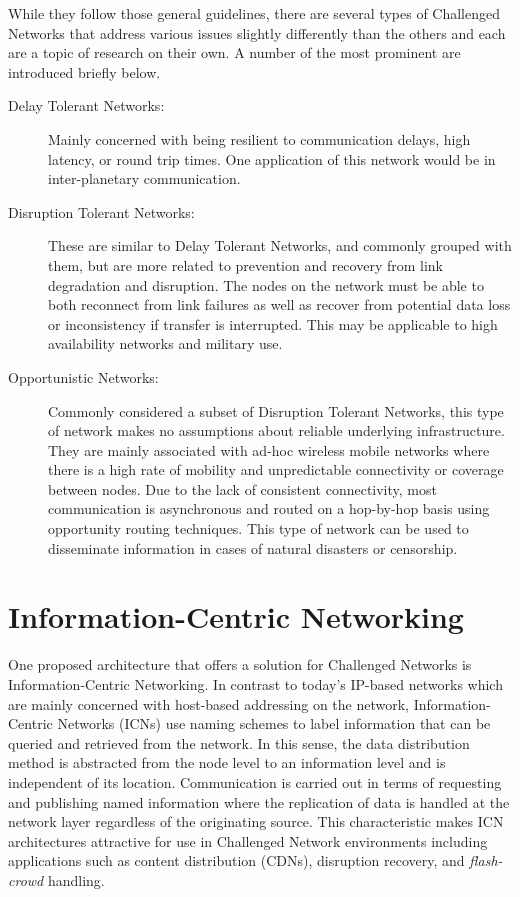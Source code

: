 \documentclass[a4paper,12pt]{report}      %
\begin{document}
While they follow those general guidelines, there are several types of Challenged Networks that
address various issues slightly differently than the others and each are a topic of research on their own.
A number of the most prominent are introduced briefly below.

\begin{description}
\item[Delay Tolerant Networks:] Mainly concerned with being resilient to communication delays, high
latency, or round trip times. One application of this network would be in inter-planetary
communication. \cite{DTNarch}\cite{rfc4838}

\item[Disruption Tolerant Networks:] These are similar to Delay Tolerant Networks, and commonly grouped
with them, but are more related to prevention and recovery from link degradation and disruption. The
nodes on the network must be able to both reconnect from link failures as well as recover from
potential data loss or inconsistency if transfer is interrupted. This may be applicable to high availability
networks and military use.

\item[Opportunistic Networks:] Commonly considered a subset of Disruption Tolerant Networks, this type of
network makes no assumptions about reliable underlying infrastructure. They are mainly associated
with ad-hoc wireless mobile networks where there is a high rate of mobility and unpredictable
connectivity or coverage between nodes. Due to the lack of consistent connectivity, most
communication is asynchronous and routed on a hop-by-hop basis using opportunity routing
techniques. This type of network can be used to disseminate information in cases of natural disasters or
censorship.
\end{description}

\section{Information-Centric Networking}

One proposed architecture that offers a solution for Challenged Networks is Information-Centric
Networking. In contrast to today's IP-based networks which are mainly concerned with host-based
addressing on the network, Information-Centric Networks (ICNs) use naming schemes to label
information that can be queried and retrieved from the network. In this sense, the data distribution
method is abstracted from the node level to an information level and is independent of its location.
Communication is carried out in terms of requesting and publishing named information where the
replication of data is handled at the network layer regardless of the originating source. This
characteristic makes ICN architectures attractive for use in Challenged Network environments
including applications such as content distribution (CDNs), disruption recovery, and \emph{flash-crowd}
handling.
\end{document}
